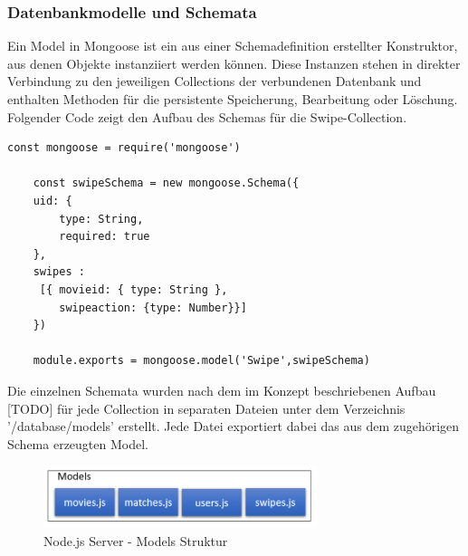 \subsubsection{Datenbankmodelle und Schemata}

Ein Model in Mongoose ist ein aus einer Schemadefinition erstellter Konstruktor, aus denen Objekte instanziiert werden können. Diese Instanzen stehen in direkter Verbindung zu den jeweiligen Collections der verbundenen Datenbank und enthalten Methoden für die persistente Speicherung, Bearbeitung oder Löschung.
\newline
Folgender Code zeigt den Aufbau des Schemas für die Swipe-Collection. 

\begin{lstlisting}[caption=Swipe Schema und Model, label=lst:modelswipe]
	const mongoose = require('mongoose')

	const swipeSchema = new mongoose.Schema({
    uid: {
        type: String,
        required: true
    },
    swipes :
     [{ movieid: { type: String },
        swipeaction: {type: Number}}]
	})

	module.exports = mongoose.model('Swipe',swipeSchema)
\end{lstlisting}

Die einzelnen Schemata wurden nach dem im Konzept beschriebenen Aufbau [TODO] für jede Collection in separaten Dateien unter dem Verzeichnis '/database/models' erstellt. Jede Datei exportiert dabei das aus dem zugehörigen Schema erzeugten Model.

\begin{figure}[h]
\centering
\includegraphics[width=8cm]{images/modelsstruktur.PNG}
\caption{Node.js Server - Models Struktur}
\end{figure}
